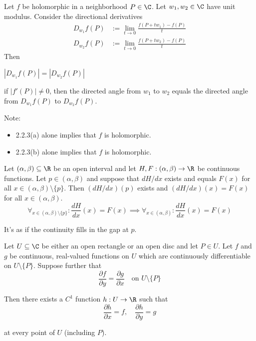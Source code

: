 \label{c41052e}

Let $f$ be holomorphic in a neighborhood $P\in\C$. Let $w_1,w_2\in\C$
have unit modulus. Consider the directional derivatives
\begin{align*}
	D_{w_1}f(P) & :=\lim_{t\to0}\frac{f(P+tw_1)-f(P)}t \\
	D_{w_2}f(P) & :=\lim_{t\to0}\frac{f(P+tw_2)-f(P)}t
\end{align*}
Then
\begin{enumerata}
	\item $|D_{w_1}f(P)|=|D_{w_2}f(P)|$
	\item if $|f'(P)|\neq0$, then the directed angle from $w_1$ to
	$w_2$ equals the directed angle from $D_{w_1}f(P)$ to $D_{w_2}f(P)$.
\end{enumerata}
Note:
\begin{itemize}
	\item 2.2.3(a) alone implies that $f$ is holomorphic.
	\item 2.2.3(b) alone implies that $f$ is holomorphic.
\end{itemize}

\label{f8abd8b}

Let $(\alpha,\beta)\subseteq\R$ be an open interval and let
$H,F:(\alpha,\beta)\to\R$ be continuous functions. Let
$p\in(\alpha,\beta)$ and suppose that $dH/dx$ exists and equals $F(x)$
for all $x\in(\alpha,\beta)\setminus\{p\}$. Then $(dH/dx)(p)$ exists
and $(dH/dx)(x)=F(x)$ for all $x\in(\alpha,\beta)$.
$$
	\forall_{x\in(\alpha,\beta)\setminus\{p\}}:\frac{dH}{dx}(x)=F(x)\implies
	\forall_{x\in(\alpha,\beta)}:\frac{dH}{dx}(x)=F(x)
$$

It's as if the continuity fills in the gap at $p$.

\label{f017dd0}

Let $U\subseteq\C$ be either an open rectangle or an open disc and let
$P\in U$. Let $f$ and $g$ be continuous, real-valued functions on $U$
which are continuously differentiable on $U\setminus\{P\}$. Suppose
further that
$$
	\frac{\partial f}{\partial y}=\frac{\partial g}{\partial x}
	\quad\text{on }U\setminus\{P\}
$$

Then there exists a $C^1$ function $h:U\to\R$ such that
$$
	\frac{\partial h}{\partial x}=f,\quad
	\frac{\partial h}{\partial y}=g
$$

at every point of $U$ (including $P$).

\label{b2d9d89}

